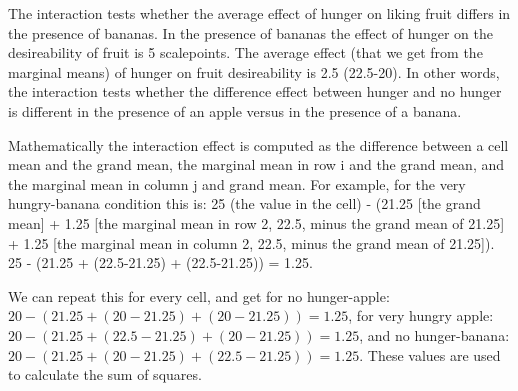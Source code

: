 \documentclass[
]{book}
\begin{document}
The interaction tests whether the average effect of hunger on liking fruit differs in the presence of bananas. In the presence of bananas the effect of hunger on the desireability of fruit is 5 scalepoints. The average effect (that we get from the marginal means) of hunger on fruit desireability is 2.5 (22.5-20). In other words, the interaction tests whether the difference effect between hunger and no hunger is different in the presence of an apple versus in the presence of a banana.

Mathematically the interaction effect is computed as the difference between a cell mean and the grand mean, the marginal mean in row i and the grand mean, and the marginal mean in column j and grand mean. For example, for the very hungry-banana condition this is: 25 (the value in the cell) - (21.25 {[}the grand mean{]} + 1.25 {[}the marginal mean in row 2, 22.5, minus the grand mean of 21.25{]} + 1.25 {[}the marginal mean in column 2, 22.5, minus the grand mean of 21.25{]}). 25 - (21.25 + (22.5-21.25) + (22.5-21.25)) = 1.25.

We can repeat this for every cell, and get for no hunger-apple: \(20 - (21.25 + (20-21.25) + (20-21.25)) = 1.25\), for very hungry apple: \(20 - (21.25 + (22.5-21.25) + (20-21.25)) = 1.25\), and no hunger-banana: \(20 - (21.25 + (20-21.25) + (22.5-21.25)) = 1.25\). These values are used to calculate the sum of squares.
\end{document}
